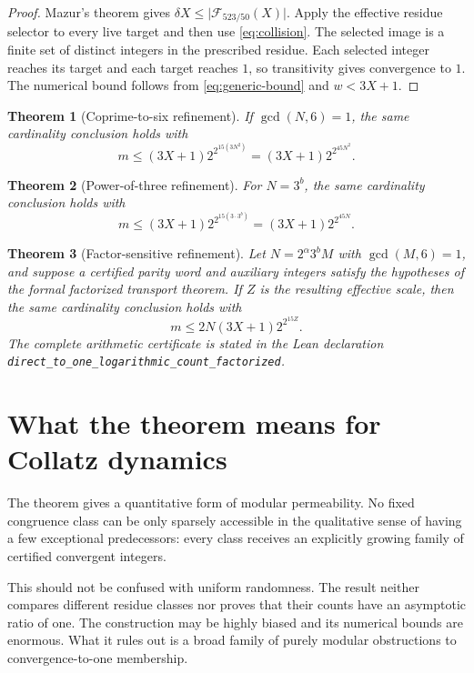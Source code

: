 \documentclass[11pt]{article}
\newtheorem{theorem}{Theorem}[section]
\theoremstyle{definition}
\theoremstyle{remark}
\newcommand{\card}[1]{\lvert #1\rvert}
\begin{document}
\begin{proof}
Mazur's theorem gives
$\delta X\le\card{\mathcal F_{523/50}(X)}$.  Apply the effective residue
selector to every live target and then use \eqref{eq:collision}.  The selected
image is a finite set of distinct integers in the prescribed residue.  Each
selected integer reaches its target and each target reaches $1$, so
transitivity gives convergence to $1$.  The numerical bound follows from
\eqref{eq:generic-bound} and $w<3X+1$.
\end{proof}

\begin{theorem}[Coprime-to-six refinement]
If $\gcd(N,6)=1$, the same cardinality conclusion holds with
\[
 m\le(3X+1)2^{2^{15(3N^2)}}
       =(3X+1)2^{2^{45N^2}}.
\]
\end{theorem}

\begin{theorem}[Power-of-three refinement]
For $N=3^b$, the same cardinality conclusion holds with
\[
 m\le(3X+1)2^{2^{15(3\cdot3^b)}}
       =(3X+1)2^{2^{45N}}.
\]
\end{theorem}

\begin{theorem}[Factor-sensitive refinement]
Let $N=2^\alpha3^bM$ with $\gcd(M,6)=1$, and suppose a certified parity word
and auxiliary integers satisfy the hypotheses of the formal factorized
transport theorem.  If $Z$ is the resulting effective scale, then the same
cardinality conclusion holds with
\[
 m\le2N(3X+1)2^{2^{15Z}}.
\]
The complete arithmetic certificate is stated in the Lean declaration
\texttt{direct\_to\_one\_logarithmic\_count\_factorized}.
\end{theorem}

\section{What the theorem means for Collatz dynamics}
The theorem gives a quantitative form of modular permeability.  No fixed
congruence class can be only sparsely accessible in the qualitative sense of
having a few exceptional predecessors: every class receives an explicitly
growing family of certified convergent integers.

This should not be confused with uniform randomness.  The result neither
compares different residue classes nor proves that their counts have an
asymptotic ratio of one.  The construction may be highly biased and its
numerical bounds are enormous.  What it rules out is a broad family of purely
modular obstructions to convergence-to-one membership.
\end{document}
